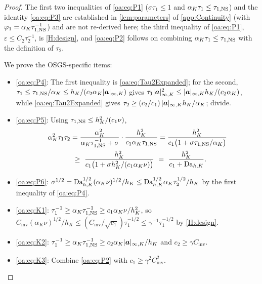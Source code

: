 \begin{proof}
The first two inequalities of \cref{oa:eq:P1} ($\sigma\tau_1\le1$ and $\alpha_K\tau_1\le\tau_{1,\mathrm{NS}}$)
and the identity \cref{oa:eq:P3} are established in \cref{lem:parameters} of
\cref{app:Continuity} (with $\varphi_1=\alpha_K\tau_{1,\mathrm{NS}}^{-1}$) and are not re-derived here; the
third inequality of \cref{oa:eq:P1}, $\varepsilon\le C_2\tau_2^{-1}$, is \cref{H:design}, and
\cref{oa:eq:P2} follows on combining $\alpha_K\tau_1\le\tau_{1,\mathrm{NS}}$ with the definition of $\tau_2$.

We prove the OSGS{\hyp}specific items:
\begin{itemize}[leftmargin=*]
  \item \cref{oa:eq:P4}: The first inequality is \cref{oa:eq:Tau2Expanded}; for the second, $\tau_1 \le \tau_{1,\mathrm{NS}}/\alpha_K \le h_K/(c_2\alpha_K|\boldsymbol{a}|_{\infty,K})$ gives $\tau_1|\boldsymbol{a}|_{\infty,K}^2 \le |\boldsymbol{a}|_{\infty,K}h_K/(c_2\alpha_K)$, while \cref{oa:eq:Tau2Expanded} gives $\tau_2 \ge (c_2/c_1)\,|\boldsymbol{a}|_{\infty,K}h_K/\alpha_K$; divide.
  \item \cref{oa:eq:P5}: Using $\tau_{1,\mathrm{NS}} \le h_K^2/(c_1\nu)$,
\[
\begin{aligned}
  \alpha_K^2\tau_1\tau_2
  &= \frac{\alpha_K^2}{\alpha_K\tau_{1,\mathrm{NS}}^{-1}+\sigma}\cdot\frac{h_K^2}{c_1\alpha_K\tau_{1,\mathrm{NS}}}
  = \frac{h_K^2}{c_1\bigl(1 + \sigma\tau_{1,\mathrm{NS}}/\alpha_K\bigr)} \\
  &\ \ge\ \frac{h_K^2}{c_1\bigl(1 + \sigma h_K^2/(c_1\alpha_K\nu)\bigr)}
  \ =\ \frac{h_K^2}{c_1 + \mathrm{Da}_{h,K}}.
\end{aligned}
\]
  \item \cref{oa:eq:P6}: $\sigma^{1/2} = \mathrm{Da}_{h,K}^{1/2}(\alpha_K\nu)^{1/2}/h_K \le \mathrm{Da}_{h,K}^{1/2}\alpha_K\tau_2^{1/2}/h_K$ by the first inequality of \cref{oa:eq:P4}.
  \item \cref{oa:eq:K1}: $\tau_1^{-1} \ge \alpha_K\tau_{1,\mathrm{NS}}^{-1} \ge c_1\alpha_K\nu/h_K^2$, so $C_{\mathrm{inv}}(\alpha_K\nu)^{1/2}/h_K \le (C_{\mathrm{inv}}/\sqrt{c_1})\tau_1^{-1/2} \le \gamma^{-1}\tau_1^{-1/2}$ by \cref{H:design}.
  \item \cref{oa:eq:K2}: $\tau_1^{-1} \ge \alpha_K\tau_{1,\mathrm{NS}}^{-1} \ge c_2\alpha_K|\boldsymbol{a}|_{\infty,K}/h_K$ and $c_2 \ge \gamma C_{\mathrm{inv}}$.
  \item \cref{oa:eq:K3}: Combine \cref{oa:eq:P2} with $c_1 \ge \gamma^2C_{\mathrm{inv}}^2$.
\end{itemize}
\end{proof}

